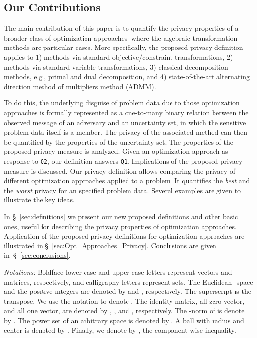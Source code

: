 \documentclass[12pt,draftcls,onecolumn]{IEEEtran}
\newcommand{\addnew}[1]{{{\color{blue!0!black}#1}}}
\begin{document}
\subsection{Our Contributions}


\addnew{The main contribution of this paper is to quantify the privacy properties of a broader class of optimization approaches, where the algebraic transformation methods  are particular cases. More specifically, the proposed privacy definition applies to 1) methods via standard objective/constraint transformations, 2) methods via standard variable transformations, 3) classical decomposition methods, e.g., primal and dual decomposition, and 4) state-of-the-art alternating direction method of multipliers method (ADMM).}


\addnew{To do this, the underlying disguise of problem data  due to those optimization approaches is formally represented as a one-to-many binary relation between the observed message of an adversary and an uncertainty set, in which the sensitive problem data  itself is a member. The privacy of the associated method can then be quantified by the properties of the uncertainty set. The properties of the proposed privacy measure is analyzed. Given an optimization approach as response to \texttt{Q2}, our definition answers \texttt{Q1}. Implications of the proposed privacy measure is discussed. Our privacy definition allows comparing the privacy of different optimization approaches applied to a problem. It quantifies the \emph{best} and the \emph{worst} privacy for an specified problem data. Several examples are given to illustrate the key ideas.}

In \S~\ref{sec:definitions} we present our new proposed definitions and other basic ones, useful for describing the privacy properties of optimization approaches. Application of the proposed privacy definitions for optimization approaches are illustrated in \S~\ref{sec:Opt_Approaches_Privacy}. Conclusions are given in~\S~\ref{sec:conclusions}.

\addnew{\emph{{Notations:}} Boldface lower case and upper case letters represent vectors and matrices, respectively, and calligraphy letters represent sets. The Euclidean- space and the positive integers are denoted by  and , respectively. The superscript  is the transpose. We use the notation  to denote . The identity matrix, all zero vector, and all one vector, are denoted by , , and , respectively. The -norm of  is denote by . The power set of an arbitrary space  is denoted by . A ball with radius  and center  is denoted by . Finally, we denote by , the component-wise inequality. }
\end{document}

